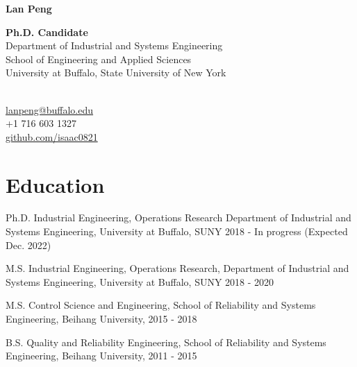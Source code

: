 \documentclass[12pt,letterpaper]{report}
\newcommand{\myname}{Lan Peng}
\newcommand{\namefont}[1]{{\normalfont\bfseries\Huge{#1}}}
\begin{document}
    \raggedright{}

    \namefont{\myname}

    \vspace{1em}
    \begin{minipage}[t]{0.700\textwidth}
        \textbf{Ph.D. Candidate} \\
        Department of Industrial and Systems Engineering \\
        School of Engineering and Applied Sciences \\
        University at Buffalo, State University of New York
    \end{minipage}
    \begin{minipage}[t]{0.295\textwidth}
        \flushright{}
        \quad\\
        \href{lanpeng@buffalo.edu}{lanpeng@buffalo.edu} \\
        +1 716 603 1327 \\
        \href{https://github.com/isaac0821}{github.com/isaac0821}
    \end{minipage}


    \section*{Education}
    \begin{tablist}
        \item[Ph.D.]  \tab{}Industrial Engineering, Operations Research \tab{}Department of Industrial and Systems Engineering, University at Buffalo, SUNY \tab{}2018 - In progress (Expected Dec. 2022)
        \item[M.S.]  \tab{}Industrial Engineering, Operations Research, \tab{}Department of Industrial and Systems Engineering, University at Buffalo, SUNY \tab{}2018 - 2020
        \item[M.S.]  \tab{}Control Science and Engineering, \tab{}School of Reliability and Systems Engineering, Beihang University, \tab{}2015 - 2018
        \item[B.S.]  \tab{}Quality and Reliability Engineering, \tab{}School of Reliability and Systems Engineering, Beihang University, \tab{}2011 - 2015
    \end{tablist}
\end{document}
